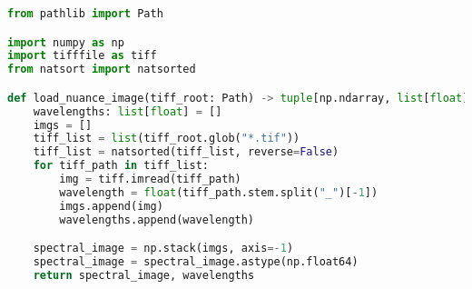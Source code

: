 \begin{lstlisting}[language=python, caption=Load Nuance Cmaera, label={code:load-nuance}]
from pathlib import Path

import numpy as np
import tifffile as tiff
from natsort import natsorted

def load_nuance_image(tiff_root: Path) -> tuple[np.ndarray, list[float]]:
    wavelengths: list[float] = []
    imgs = []
    tiff_list = list(tiff_root.glob("*.tif"))
    tiff_list = natsorted(tiff_list, reverse=False)
    for tiff_path in tiff_list:
        img = tiff.imread(tiff_path)
        wavelength = float(tiff_path.stem.split("_")[-1])
        imgs.append(img)
        wavelengths.append(wavelength)

    spectral_image = np.stack(imgs, axis=-1)
    spectral_image = spectral_image.astype(np.float64)
    return spectral_image, wavelengths

\end{lstlisting}
